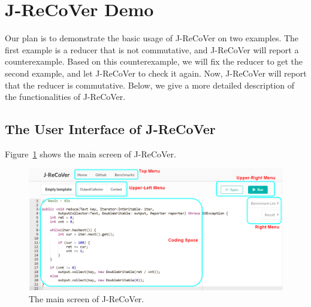 % 
\clearpage
\appendix

\section{J-ReCoVer Demo}

Our plan is to demonstrate the basic usage of J-ReCoVer on two examples. The
first example is a reducer that is not commutative, and J-ReCoVer will report a
counterexample. Based on this counterexample, we will fix the reducer to get the
second example, and let J-ReCoVer to check it again. Now, J-ReCoVer will report
that the reducer is commutative. Below, we give a more detailed description of
the functionalities of J-ReCoVer. 

\subsection{The User Interface of J-ReCoVer}
\label{appendix:1}

Figure~\ref{fig:main_screen} shows the main screen of J-ReCoVer. 

\begin{figure}
\begin{center}
\includegraphics[width=.9\linewidth]{screenshots/main_screen_marked}
\caption{The main screen of J-ReCoVer.}
\label{fig:main_screen}
\end{center}
\end{figure}

